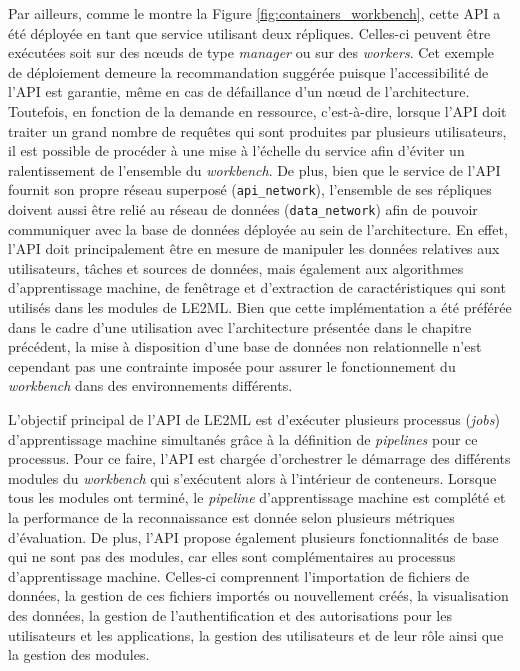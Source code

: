 Par ailleurs, comme le montre la Figure \ref{fig:containers_workbench}, cette \acs{API} a été déployée en tant que service utilisant deux répliques. Celles-ci peuvent être exécutées soit sur des n\oe{}uds de type \textit{manager} ou sur des \textit{workers}. Cet exemple de déploiement demeure la recommandation suggérée puisque l'accessibilité de l'\acs{API} est garantie, même en cas de défaillance d'un n\oe{}ud de l'architecture. Toutefois, en fonction de la demande en ressource, c'est-à-dire, lorsque l'API doit traiter un grand nombre de requêtes qui sont produites par plusieurs utilisateurs, il est possible de procéder à une mise à l'échelle du service afin d'éviter un ralentissement de l'ensemble du \textit{workbench}. De plus, bien que le service de l'\acs{API} fournit son propre réseau superposé (\texttt{api\_network}), l'ensemble de ses répliques doivent aussi être relié au réseau de données (\texttt{data\_network}) afin de pouvoir communiquer avec la base de données déployée au sein de l'architecture. En effet, l'\acs{API} doit principalement être en mesure de manipuler les données relatives aux utilisateurs, tâches et sources de données, mais également aux algorithmes d'apprentissage machine, de fenêtrage et d'extraction de caractéristiques qui sont utilisés dans les modules de \acs{LE2ML}. Bien que cette implémentation a été préférée dans le cadre d'une utilisation avec l'architecture présentée dans le chapitre précédent, la mise à disposition d'une base de données non relationnelle n'est cependant pas une contrainte imposée pour assurer le fonctionnement du \textit{workbench} dans des environnements différents.

L'objectif principal de l'\acs{API} de \acs{LE2ML} est d'exécuter plusieurs processus (\emph{jobs}) d'apprentissage machine simultanés grâce à la définition de \textit{pipelines} pour ce processus. Pour ce faire, l'API est chargée d'orchestrer le démarrage des différents modules du \textit{workbench} qui s'exécutent alors à l'intérieur de conteneurs. Lorsque tous les modules ont terminé, le \textit{pipeline} d'apprentissage machine est complété et la performance de la reconnaissance est donnée selon plusieurs métriques d'évaluation. De plus, l'\acs{API} propose également plusieurs fonctionnalités de base qui ne sont pas des modules, car elles sont complémentaires au processus d'apprentissage machine. Celles-ci comprennent l'importation de fichiers de données, la gestion de ces fichiers importés ou nouvellement créés, la visualisation des données, la gestion de l'authentification et des autorisations pour les utilisateurs et les applications, la gestion des utilisateurs et de leur rôle ainsi que la gestion des modules.

